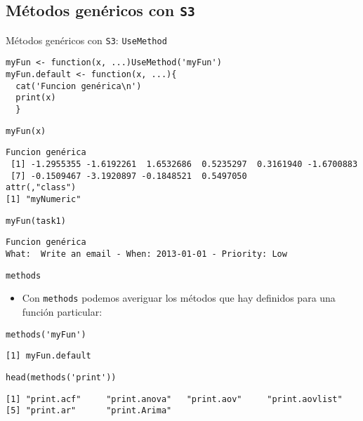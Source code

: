 \documentclass[xcolor={usenames,svgnames,dvipsnames}]{beamer}
\begin{document}
\subsection{Métodos genéricos con \texttt{S3}}
\label{sec-2-3}
\begin{frame}[fragile,label=sec-2-3-1]{Métodos genéricos con \texttt{S3}: \texttt{UseMethod}}
 \lstset{language=R,numbers=none}
\begin{lstlisting}
myFun <- function(x, ...)UseMethod('myFun')
myFun.default <- function(x, ...){
  cat('Funcion genérica\n')
  print(x)
  }
\end{lstlisting}

\lstset{language=R,numbers=none}
\begin{lstlisting}
myFun(x)
\end{lstlisting}

\begin{verbatim}
Funcion genérica
 [1] -1.2955355 -1.6192261  1.6532686  0.5235297  0.3161940 -1.6700883
 [7] -0.1509467 -3.1920897 -0.1848521  0.5497050
attr(,"class")
[1] "myNumeric"
\end{verbatim}

\lstset{language=R,numbers=none}
\begin{lstlisting}
myFun(task1)
\end{lstlisting}

\begin{verbatim}
Funcion genérica
What:  Write an email - When: 2013-01-01 - Priority: Low
\end{verbatim}
\end{frame}
\begin{frame}[fragile,label=sec-2-3-2]{\texttt{methods}}
 \begin{itemize}
\item Con \texttt{methods} podemos averiguar los métodos que hay definidos para una función particular:
\end{itemize}
\lstset{language=R,numbers=none}
\begin{lstlisting}
methods('myFun')
\end{lstlisting}

\begin{verbatim}
[1] myFun.default
\end{verbatim}

\lstset{language=R,numbers=none}
\begin{lstlisting}
head(methods('print'))
\end{lstlisting}

\begin{verbatim}
[1] "print.acf"     "print.anova"   "print.aov"     "print.aovlist"
[5] "print.ar"      "print.Arima"
\end{verbatim}
\end{frame}
\end{document}
